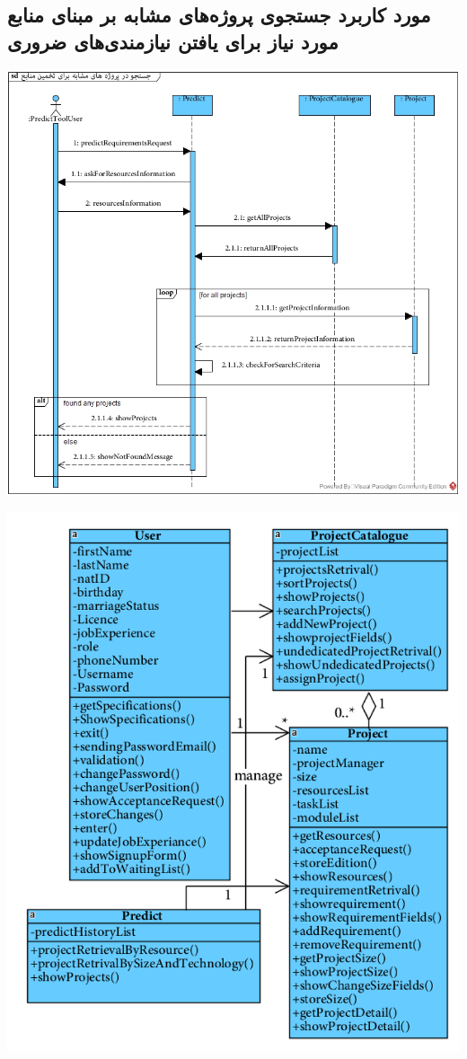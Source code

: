 \newpage
\vspace{2cm}
\subsection*{مورد کاربرد جستجوی پروژه‌های مشابه بر مبنای منابع مورد نیاز برای یافتن نیازمندی‌های ضروری}
\vspace{2cm}
\begin{center}
\includegraphics[width=\textwidth]{SequenceDiagrams/45.jpg}
\end{center}

\newpage
\vspace{2cm}
\begin{center}
\includegraphics[width=\textwidth]{SequenceClasses/45.png}
\end{center}